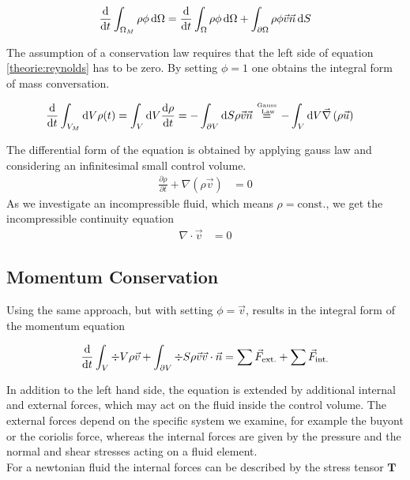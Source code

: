 \begin{align}
    \label{theorie:reynolds}
    \frac{\mathop{}\!\mathrm{d}}{\mathop{}\!\mathrm{d} t} \int_{\Omega_M} \rho \phi \mathop{}\!\mathrm{d} \Omega = \frac{\mathop{}\!\mathrm{d}}{\mathop{}\!\mathrm{d} t}\int_{\Omega} \rho \phi \mathop{}\!\mathrm{d} \Omega + \int_{\partial\Omega} \rho \phi \vec{v} \vec{n} \mathop{}\!\mathrm{d} S
\end{align}

The assumption of a conservation law requires that the left side of equation \ref{theorie:reynolds} has to be zero.
By setting $\phi = 1$ one obtains the integral form of mass conversation.

\begin{align}
    \frac{\dif}{\dif t} \int_{V_M}\dif V \rho(t) =  \int_{V}\dif V \frac{\dif \rho}{\dif t}  &=-\int_{\partial V}\dif S
     \rho \vec{v}\vec{n} \stackrel{\text{Gauss} \atop \text{ Law}}{=}
      -\int_V \dif V \vec{\nabla}\left(\rho \vec{u}\right)
\end{align}

The differential form of the equation is obtained by applying gauss law and considering an infinitesimal small control volume.
\begin{align}
     \frac{\partial \rho}{\partial t}  + \nabla \left(\rho \vec{v}\right) &= 0
\end{align}
As we investigate an incompressible fluid, which means $\rho = \text{const.}$, we get the incompressible continuity equation
\begin{align}
     \nabla \cdot \vec{v} &= 0
\end{align}

\subsection{Momentum Conservation}

Using the same approach, but with setting $\phi = \vec{v}$, results in the integral form of the momentum equation

\begin{align}
    \label{theorie:intimpulse}
    \frac{\mathop{}\!\mathrm{d}}{\mathop{}\!\mathrm{d} t} \int_V \div V \rho \vec{v} + \int_{\partial V} \div S \rho\vec{v}\vec{v}\cdot \vec{n}  =  \sum \vec{F}_{\text{ext.}} + \sum \vec{F}_{\text{int.}}
\end{align}

In addition to the left hand side, the equation is extended by additional internal and external forces, which may act on the fluid inside the control volume.
The external forces depend on the specific system  we examine, for example the buyont or the coriolis force, whereas the internal forces
are given by the pressure and the normal and shear stresses acting on a fluid element.\\
For a newtonian fluid the internal forces can be described by the stress tensor $\bm{T}$


